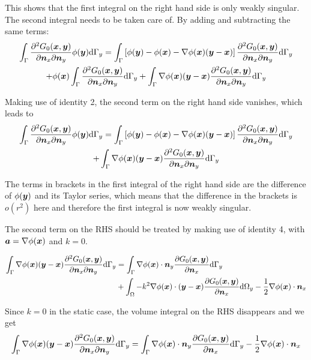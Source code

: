 \documentclass[a4paper, 10pt]{article}
\newcommand{\td}{\mathrm{d}}
\newcommand{\sa}{\bm{\mathnormal{a}}}
\newcommand{\sx}{\bm{\mathnormal{x}}}
\newcommand{\sy}{\bm{\mathnormal{y}}}
\newcommand{\sn}{\bm{\mathnormal{n}}}
\begin{document}
This shows that the first integral on the right hand side is only weakly singular.
The second integral needs to be taken care of. By adding and subtracting the same terms:
%
\begin{multline}
	\int_\Gamma \frac{\partial^2 G_0(\sx, \sy)}{\partial \sn_x \partial \sn_y} \phi(\sy) \td \Gamma_y =
	\int_\Gamma \left[\phi(\sy) - \phi(\sx) - \nabla \phi(\sx) (\sy - \sx) \right] \frac{\partial^2 G_0(\sx, \sy)}{\partial \sn_x \partial \sn_y} \td \Gamma_y \\
	+ \phi(\sx) \int_\Gamma \frac{\partial^2 G_0(\sx, \sy)}{\partial \sn_x \partial \sn_y} \td \Gamma_y +
	\int_\Gamma \nabla \phi(\sx) (\sy - \sx) \frac{\partial^2 G_0(\sx, \sy)}{\partial \sn_x \partial \sn_y} \td \Gamma_y
\end{multline}

Making use of identity 2, the second term on the right hand side vanishes, which leads to
%
\begin{multline}
	\int_\Gamma \frac{\partial^2 G_0(\sx, \sy)}{\partial \sn_x \partial \sn_y} \phi(\sy) \td \Gamma_y =
	\int_\Gamma \left[\phi(\sy) - \phi(\sx) - \nabla \phi(\sx) (\sy - \sx) \right] \frac{\partial^2 G_0(\sx, \sy)}{\partial \sn_x \partial \sn_y} \td \Gamma_y \\
	+ \int_\Gamma \nabla \phi(\sx) (\sy - \sx) \frac{\partial^2 G_0(\sx, \sy)}{\partial \sn_x \partial \sn_y} \td \Gamma_y
\end{multline}

The terms in brackets in the first integral of the right hand side are the difference of $\phi(\sy)$ and its Taylor series, which means that the difference in the brackets is $o(r^2)$ here and therefore the first integral is now weakly singular.

The second term on the RHS should be treated by making use of identity 4, with $\sa = \nabla\phi(\sx)$ and $k = 0$.

\begin{align}
	\int_\Gamma \nabla \phi(\sx) (\sy - \sx) \frac{\partial^2 G_0(\sx, \sy)}{\partial \sn_x \partial \sn_y} \td \Gamma_y & = 
	\int_\Gamma \nabla \phi(\sx) \cdot \sn_y \frac{\partial G_0(\sx,\sy)}{\partial \sn_x} \td \Gamma_y \nonumber \\
	&+ \int_\Omega -k^2 \nabla \phi(\sx) \cdot (\sy - \sx) \frac{\partial G_0(\sx, \sy)}{\partial \sn_x} \td \Omega_y
	-\frac{1}{2} \nabla \phi(\sx) \cdot \sn_x
\end{align}

Since $k = 0$ in the static case, the volume integral on the RHS disappears and we get
%
\begin{equation}
	\int_\Gamma \nabla \phi(\sx) (\sy - \sx) \frac{\partial^2 G_0(\sx, \sy)}{\partial \sn_x \partial \sn_y} \td \Gamma_y = 
	\int_\Gamma \nabla \phi(\sx) \cdot \sn_y \frac{\partial G_0(\sx,\sy)}{\partial \sn_x} \td \Gamma_y -\frac{1}{2} \nabla \phi(\sx) \cdot \sn_x
\end{equation}
\end{document}
